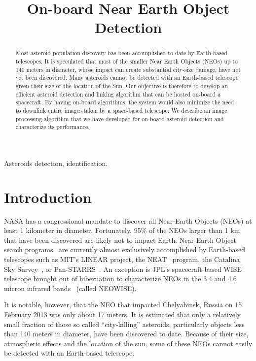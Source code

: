 \documentclass{article}
\title{ On-board Near Earth Object Detection
}
\begin{document}
%
\maketitle
%
\begin{abstract}
Most asteroid population discovery has been accomplished to date by Earth-based telescopes. It is speculated that most of the smaller Near Earth Objects (NEOs) up to 140 meters in diameter, whose impact can create substantial city-size damage, have not yet been discovered.  Many asteroids cannot be detected with an Earth-based telescope given their size or the location of the Sun.  Our objective is therefore to develop an efficient asteroid detection and linking algorithm that can be hosted on-board a spacecraft.  By having on-board algorithms, the system would also minimize the need to downlink entire images taken by a space-based telescope. We describe an image processing algorithm that we have developed for on-board asteroid detection and characterize its performance.
 
\end{abstract}
%
\begin{keywords}
Asteroids detection, identification. 
\end{keywords}
%
\section{Introduction}
\label{sec:intro}

NASA has a congressional mandate to discover all Near-Earth Objects (NEOs) at least 1 kilometer in diameter.  Fortunately, 95\% of the NEOs larger than 1 km that have been discovered are likely not to impact Earth.  
Near-Earth Object search programs~\cite{stokes2002near} are currently almost exclusively accomplished by Earth-based telescopes such as MIT's LINEAR \cite{evans2003detection}  project, the NEAT~\cite{neat2014} program, the Catalina Sky Survey~\cite{css2014}, or  Pan-STARRS~\cite{denneau2013pan}.  An exception is JPL's spacecraft-based WISE telescope brought out of hibernation to characterize NEOs in the 3.4 and 4.6 micron infrared bands~\cite{wise2014} (called NEOWISE). 

It is notable, however, that the NEO that impacted Chelyabinsk, Russia on 15 February 2013 was only about 17 meters.
It is estimated that only a relatively small fraction of those so called ``city-killing'' asteroids, particularly objects less than 140 meters in diameter, have been discovered to date. Because of their size, atmospheric effects and the location of the sun, some of these NEOs cannot easily be detected with an Earth-based telescope.  
\end{document}

